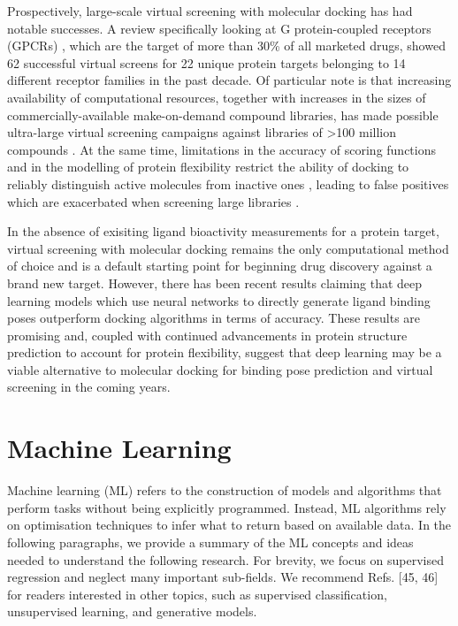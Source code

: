 Prospectively, large-scale virtual screening with molecular docking has had notable successes. A review specifically looking at G protein-coupled receptors (GPCRs) \cite{Ballante2021DockingGPCR}, which are the target of more than 30\% of all marketed drugs, showed 62 successful virtual screens for 22 unique protein targets belonging to 14 different receptor families in the past decade. Of particular note is that increasing availability of computational resources, together with increases in the sizes of commercially-available make-on-demand compound libraries, has made possible ultra-large virtual screening campaigns against libraries of >100 million compounds  \cite{Lyu2019UltraLargeDocking, Alon2021sigma, Fink2022Alpha}. At the same time, limitations in the accuracy of scoring functions and in the modelling of protein flexibility \cite{Erickson2004flexibility, Antunes2015flexibility} restrict the ability of docking to reliably distinguish active molecules from inactive ones \cite{Llanos2021StrengthsAndWeaknesses, Macip2022HasteMakesWaste}, leading to false positives which are exacerbated when screening large libraries \cite{Lyu2023Expansion}.

In the absence of exisiting ligand bioactivity measurements for a protein target, virtual screening with molecular docking remains the only computational method of choice and is a default starting point for beginning drug discovery against a brand new target. However, there has been recent results claiming that deep learning models which use neural networks to directly generate ligand binding poses \cite{Stark2022equibind, corso2023diffdock} outperform docking algorithms in terms of accuracy. These results are promising and, coupled with continued advancements in protein structure prediction to account for protein flexibility, suggest that deep learning may be a viable alternative to molecular docking for binding pose prediction and virtual screening in the coming years.

\section{Machine Learning} \label{ch:machine_learning}

Machine learning (ML) refers to the construction of models and algorithms that perform tasks without being explicitly programmed. Instead, ML algorithms rely on optimisation techniques to infer what to return based on available data. In the following paragraphs, we provide a summary of the ML concepts and ideas needed to understand the following research. For brevity, we focus on supervised regression and neglect many important sub-fields. We recommend Refs. [45, 46] for readers interested in other topics, such as supervised classification, unsupervised learning, and generative models.

